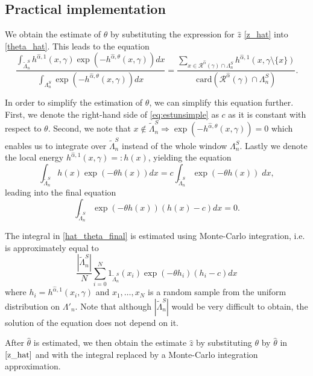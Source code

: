 \subsection{Practical implementation}
We obtain the estimate of $\theta$ by substituting the expression for $\hat z$ \eqref{z_hat} into \eqref{theta_hat}.
This leads to the equation
\begin{equation}\label{eq:estunsimple} 
\frac{\int_{\tilde\Lambda^S_n}  h^{\hat\alpha,1}(x,\gamma)\exp{\left(-h^{\hat\alpha,\theta}(x,\gamma)\right)} dx} {  \int_{\Lambda^S_n} \exp{\left( -h^{\hat\alpha,\theta}(x,\gamma)\right)} dx} 
= \frac {\sum_{x \in \mathcal R^{\hat\alpha}(\gamma)\cap \Lambda^S_n} h^{\hat\alpha,1}(x,\gamma\setminus\{x\})} { \mbox{card}(\mathcal R^{\hat\alpha}(\gamma)\cap \Lambda^S_n) }. 
\end{equation}

In order to simplify the estimation of $\theta$, we can simplify this equation further. First, we denote the right-hand side of \eqref{eq:estunsimple} as $c$ as it  is constant with respect to $\theta$. Second, we note that $x \notin \tilde\Lambda^S_n  \Rightarrow \exp{\left(-h^{\hat\alpha,\theta}(x,\gamma)\right)}= 0$ which enables us to integrate over $\tilde\Lambda^S_n$ instead of the whole window $\Lambda^S_n$. Lastly we denote the local energy $h^{\hat\alpha,1}(x,\gamma) =: h(x)$, yielding the equation 
$$ \int_{\tilde\Lambda^S_n} h(x) \exp{\left(-\theta h(x)\right)} dx = c \int_{\tilde\Lambda^S_n} \exp{\left(-\theta h(x)\right)}\;dx, $$
leading into the final equation
\begin{equation}\label{hat_theta_final} 
\int_{\tilde\Lambda^S_n} \exp{\left(-\theta h(x)\right)} (h(x) - c) dx = 0 .
\end{equation}

The integral in \eqref{hat_theta_final} is estimated using Monte-Carlo integration, i.e. is approximately equal to
$$ \frac {|\tilde\Lambda^S_n|}N \sum_{i=0}^N 1_{\tilde\Lambda^S_n}(x_i) \exp{\left( - \theta h_i \right )} (h_i- c) dx $$
where $h_i = h^{\hat\alpha,1}(x_i, \gamma)$ and $x_1,\dots,x_N$ is a random sample from the uniform distribution on $\Lambda'_n$. Note that although $|\tilde\Lambda^S_n|$ would be very difficult to obtain, the solution of the equation does not depend on it.

After $\hat\theta$ is estimated, we then obtain the estimate $\hat z$ by substituting $\theta$ by $\hat\theta$ in $\eqref{z_hat}$ and with the integral replaced by a Monte-Carlo integration approximation.


